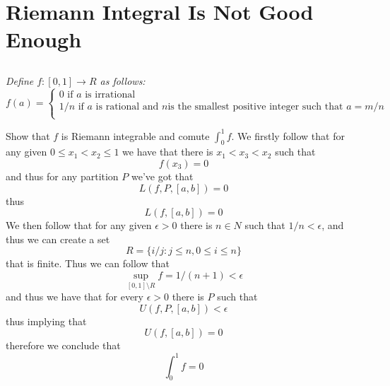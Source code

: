\documentclass[11pt,oneside,titlepage]{book}
\newcommand{\set}[1]{\{ #1 \}}
\begin{document}
\section{Riemann Integral Is Not Good Enough}

\subsection{}

\textit{Define $f: [0, 1] \to R$ as follows:
$$ f(a) = 
\begin{cases}
  0 \text{ if } a \text{ is irrational} \\
  1/n \text{ if } a \text{ is rational and } n \text{
  is the smallest positive integer such that } a = m/n \\
\end{cases}
$$}

Show that $f$ is Riemann integrable and comute $\int_0^1{f}$. We
firstly follow that for any given $0 \leq x_1 < x_2 \leq 1$ we have that
there is $x_1 < x_3 < x_2$ such that
$$f(x_3) = 0$$
and thus for any partition $P$ we've got that
$$L(f, P, [a, b]) = 0$$
thus
$$L(f, [a, b]) = 0$$
We then follow that for any given $\epsilon > 0$ there is $n \in N$
such that $1/n < \epsilon$, and thus we can create a set
$$R = \set{i/j: j \leq n, 0 \leq i \leq n}$$
that is finite. Thus we can follow that
$$\sup_{[0, 1] \setminus R}{f} = 1/(n + 1) < \epsilon$$
and thus we have that for every $\epsilon > 0$ there is $P$ such that
$$U(f, P, [a, b]) < \epsilon$$
thus implying that
$$U(f, [a, b]) = 0$$
therefore we conclude that
$$\int_0^1{f} = 0$$
\end{document}
